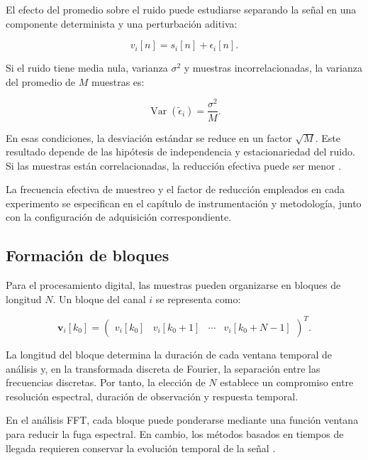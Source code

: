 El efecto del promedio sobre el ruido puede estudiarse separando la
señal en una componente determinista y una perturbación aditiva:

\begin{equation}
    v_i[n]
    =
    s_i[n]+\epsilon_i[n].
\end{equation}

Si el ruido tiene media nula, varianza $\sigma^2$ y muestras
incorrelacionadas, la varianza del promedio de $M$ muestras es:

\begin{equation}
    \operatorname{Var}(\tilde{\epsilon}_i)
    =
    \frac{\sigma^2}{M}.
    \label{eq:varianza_promediado}
\end{equation}

En esas condiciones, la desviación estándar se reduce en un factor
$\sqrt{M}$. Este resultado depende de las hipótesis de independencia y
estacionariedad del ruido. Si las muestras están correlacionadas, la
reducción efectiva puede ser menor
\cite{lyons2010understanding,mitra2006digital}.

La frecuencia efectiva de muestreo y el factor de reducción empleados
en cada experimento se especifican en el capítulo de instrumentación y
metodología, junto con la configuración de adquisición correspondiente.

\subsection*{Formación de bloques}

Para el procesamiento digital, las muestras pueden organizarse en
bloques de longitud $N$. Un bloque del canal $i$ se representa como:

\begin{equation}
    \mathbf{v}_i[k_0]
    =
    \begin{pmatrix}
        v_i[k_0] &
        v_i[k_0+1] &
        \cdots &
        v_i[k_0+N-1]
    \end{pmatrix}^{T}.
    \label{eq:bloque_temporal}
\end{equation}



La longitud del bloque determina la duración de cada ventana temporal
de análisis y, en la transformada discreta de Fourier, la separación
entre las frecuencias discretas. Por tanto, la elección de $N$ establece
un compromiso entre resolución espectral, duración de observación y
respuesta temporal.

En el análisis FFT, cada bloque puede ponderarse mediante una función
ventana para reducir la fuga espectral. En cambio, los métodos basados
en tiempos de llegada requieren conservar la evolución temporal de la
señal \cite{harris1978use,oppenheim1999discrete}.

